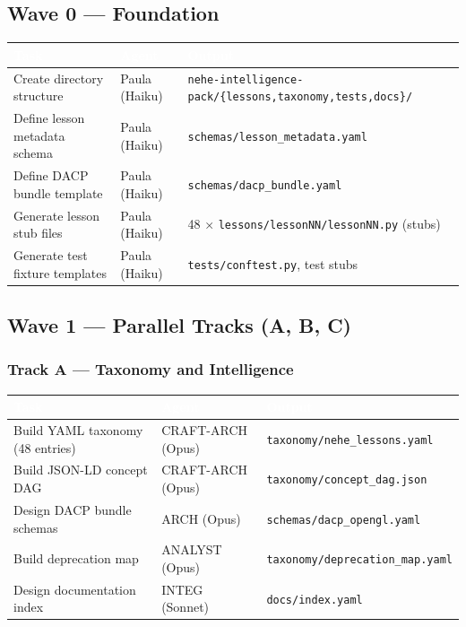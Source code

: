 \documentclass[11pt,letterpaper]{article}
\newcommand{\tableheader}[1]{\textbf{\sffamily\textcolor{white}{#1}}}
\begin{document}
\subsection{Wave 0 --- Foundation}

\begin{center}
\begin{tabularx}{\textwidth}{L{4cm}L{3cm}X}
\toprule
{}
\tableheader{Task} & \tableheader{Agent} & \tableheader{Output} \\
\midrule
Create directory structure & Paula (Haiku) & \texttt{nehe-intelligence-pack/\{lessons,taxonomy,tests,docs\}/} \\
Define lesson metadata schema & Paula (Haiku) & \texttt{schemas/lesson\_metadata.yaml} \\
Define DACP bundle template & Paula (Haiku) & \texttt{schemas/dacp\_bundle.yaml} \\
Generate lesson stub files & Paula (Haiku) & 48 × \texttt{lessons/lessonNN/lessonNN.py} (stubs) \\
Generate test fixture templates & Paula (Haiku) & \texttt{tests/conftest.py}, test stubs \\
\bottomrule
\end{tabularx}
\end{center}

\subsection{Wave 1 --- Parallel Tracks (A, B, C)}

\subsubsection{Track A --- Taxonomy and Intelligence}

\begin{center}
\begin{tabularx}{\textwidth}{L{4cm}L{3cm}X}
\toprule
{}
\tableheader{Task} & \tableheader{Agent} & \tableheader{Output} \\
\midrule
Build YAML taxonomy (48 entries) & CRAFT-ARCH (Opus) & \texttt{taxonomy/nehe\_lessons.yaml} \\
Build JSON-LD concept DAG & CRAFT-ARCH (Opus) & \texttt{taxonomy/concept\_dag.json} \\
Design DACP bundle schemas & ARCH (Opus) & \texttt{schemas/dacp\_opengl.yaml} \\
Build deprecation map & ANALYST (Opus) & \texttt{taxonomy/deprecation\_map.yaml} \\
Design documentation index & INTEG (Sonnet) & \texttt{docs/index.yaml} \\
\bottomrule
\end{tabularx}
\end{center}
\end{document}
